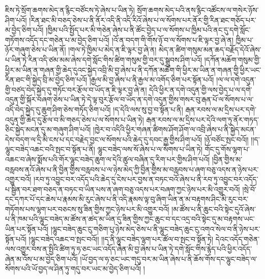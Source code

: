 ཇིས་ཏེ་སྲོག་ཆགས་མེད་ན་རྙིང་བཙོངས་ཏེ་ཞེས་པ་ཡིན་ཏེ། སྲོག་ཆགས་མེད་པའི་ནས་རྙིང་འཚོངས་ལ་གསེར་ཉོས་ཤིག་པའོ། །རིན་ཐང་མི་བཅད་ཅེས་པ་ནི་ནོར་འདི་ནི་འདི་རིའོ་ཞེས་པ་ལ་སོགས་པར་ནོར་གྱི་རིན་ཐང་གཅོད་པར་མ་བྱེད་ཅིག་པའོ། །ཁྱིམ་པའི་སྤྱོད་པར་མི་གཅེན་ཞེས་པ་ནི་ཚོང་བྱེད་པ་ལ་སོགས་པ་ཁྱིམ་པའི་ནང་དུ་དགེ་སློང་གཏོགས་འདོད་དང་གཅེན་པ་མ་བྱེད་ཅིག་པའོ། །འོ་ན་བདག་གི་གོས་ཉོ་བ་ལ་སོགས་པ་ཇི་ལྟར་བྱ་ཞེ་ན། ཁྱིམ་པ་ཉོར་གཞུག་ཅེས་པ་ཡིན་ནོ། །གལ་ཏེ་ཁྱིམ་པ་མེད་ན་ཇི་ལྟར་བྱ་ཞེ་ན། མེད་ན་ཚིག་གསུམ་མན་ཆད་བརྗོད་དེའོ་ཞེས་པ་ཡིན་ཏེ་རིན་འདི་ཙམ་མམ་ཞེས་དགེ་སློང་གིས་ཚིག་གསུམ་གྱི་བར་དུ་སྒྲུབས་ཤིག་པའོ། །དཀོན་མཆོག་གསུམ་གྱི་ཕྱིར་མ་ཡིན་ན་གཞན་གྱི་ཆེད་དུའང་སྐྱེད་འབྲི་མི་བྱ་ཞེས་པ་ནི་དཀོན་མཆོག་གི་ཕྱིར་མ་ཡིན་ན་གཞན་གྱི་ཕྱིར་ཡང་རིན་ཐང་གི་སྐྱེད་བྲི་མ་བྱེད་ཅིག་པའོ། །རྒྱལ་མི་བྱ་ཞེས་པ་ནི་རྒྱལ་མ་འགོད་ཅིག་པར་སྟོན་པའོ། །ལ་ལ་དགེ་འདུན་གྱི་བཙད་བེད་སྐྱེད་དུ་གཏོང་བར་རྩོལ་བ་ཡོད་ན་ཇི་ལྟར་བྱ་ཞེ་ན། དེའི་ཕྱིར་ན་དགེ་འདུན་གྱི་ལས་བྱེད་པ་ལ་དགེ་འདུན་གྱི་སྐོར་བཞག་ཅེས་པ་ཡིན་ཏེ་དེ་ལྟ་བུར་རྩོལ་བ་ཡོད་ན་དགེ་འདུན་གྱིས་གསར་བུ་རྒན་པོ་ལ་སོགས་པ་ལ་འདི་བེད་སྐྱེད་དུ་ཆུག་ཤིག་ཅེས་གཏོད་ཅིག་པའོ། །ད་དེའི་ལས་སུ་བྱ་བ་སྟོན་པ་ནི། རྒན་རབས་ལ་མ་དྲིས་པར་དགེ་འདུན་གྱི་ཆེད་དུ་རྩོལ་བ་མི་གཅད་ཅེས་པ་ལ་སོགས་པ་ཡིན་ཏེ། རྒན་རབས་ལ་མ་དྲིས་པར་དེའི་ལག་ཏུ་ནོར་གཏད་ཅིང་སྐྱེད་མངན་དུ་མ་གཞུག་ཤིག་པའོ། །ཁྱེར་བ་འདིའི་ཕྱིར་གཞན་ཚིགས་ཤོག་ཤོག་ལ་འབྲི་ཞེས་པ་ནི་སྐྱེད་མངན་དེས་བདག་ལ་དྲི་མི་ངས་པ་དང་བརྗེད་བྱང་ལ་སོགས་པའི་ཆེད་དུ་དབང་རྒྱ་གྱིས་ཤིག་པའོ། །ཉོ་བཙོང་སྤང་བའོ།། །།ད་ལྷུང་བཟེད་འཆང་བའི་སྤང་བ་སྟོན་པ་ནི། ལྷུང་བཟེད་ལས་སོ་ཞེས་པ་ལ་སོགས་པ་ཡིན་ཏེ། གོང་དུ་གོས་ལྷག་པ་འཆང་བ་ཞེས་སྨོས་པའི་གོར་ལྷུང་བཟེད་ཆུག་ལ་དེའི་ཚུལ་བཞིན་དུ་རིག་པར་གྱིས་ཤིག་པའོ། །བྱིན་གྱིས་མ་བརླབས་ནའོ་ཞེས་པ་ནི་བྱིན་གྱིས་བརླབས་པ་ལ་ཉེས་མེད་ཀྱི་བྱིན་གྱིས་མ་བརླབས་པ་ཞག་བཅུ་འདས་ན་ཉེས་པར་འགྱུར་བའོ། །རབ་ཏུ་འབྱུང་བར་འདོད་པའི་ཆེད་དུ་ངེས་པར་བྱས་ན་བཏང་བའོ་ཞེས་པ་ནི་རབ་ཏུ་འབྱུང་བར་འདོད་པ་སྦྱིན་བར་ཐག་བཅད་ན་བཏང་བ་ཡིན་པས་ན་ཞག་བཅུ་འདས་པར་བཞག་ཀྱང་ཉེས་པར་མི་འགྱུར་བའོ། །སྲེ་བོ་དང་དཀར་པོ་དང་ཆེས་པ་རྣམས་མི་རུང་ཞེས་པ་ནི་འདི་རྣམས་ལྟ་བུ་ཞིག་ཡིན་ན་མ་བརྟགས་ཤིང་མི་རུང་བར་གཏོགས་པས་ལྷག་པར་བཅངས་སུ་ཟིན་གྱིས་ཀྱང་ཉེས་པར་མི་འགྱུར་བའོ། །མ་ཚོས་པ་ནི་ཆུང་བའི་སྟེང་དུའོ་ཞེས་པ་ནི་ཁམ་པའི་ལྷུང་བཟེད་མ་ཚོས་ན་ཚད་མ་ཡིན་དུ་ཟིན་གྱིས་ཀྱང་ཆུང་བ་དང་འདྲ་བའི་སྟེང་དུ་མ་བརྟགས་ཡང་ཡིན་པར་སྟོན་པའོ། །ལྷུང་བཟེད་ཆུང་ངུ་གཅིག་པུ་ཉེས་མེད་ཅེས་པ་ནི་ལྷུང་བཟེད་ཆུང་ངུ་འགའ་སེལ་བ་ནི་ཉེས་པར་སྟོན་པའོ། །ལྷུང་བཟེད་འཆང་བ་སྤང་བའོ།། །།ད་ནི་ལྷུང་བཟེད་ལྷག་པར་ཚོལ་བ་སྤང་བ་སྟོན་ཏེ། དེའང་འདོད་གཅེན་ལས་འགྱུར་བས་ན་སྤྱིའི་ཚིག་ཏུ་ཧ་ཅང་ཡང་འདོད་ཞེན་མི་བྱ་ཞེས་པ་ཡིན་ཏེ་དགེ་སློང་གིས་རྙེད་པའི་ཕྱིར་འདོད་ཞེན་མ་འོས་པ་མ་བྱེད་ཅིག་པའོ། །ཡོ་བྱད་ལ་ཧ་ཅང་ཡང་གདུ་བར་མ་ཡིན་ཞེས་པ་ནི་ཆོས་གོས་དང་ལྷུང་བཟེད་ལ་སོགས་པའི་ཡོ་བྱད་ལ་ཤིན་ཏུ་གདུ་བར་ཡང་མ་བྱེད་ཅིག་པའོ། །
